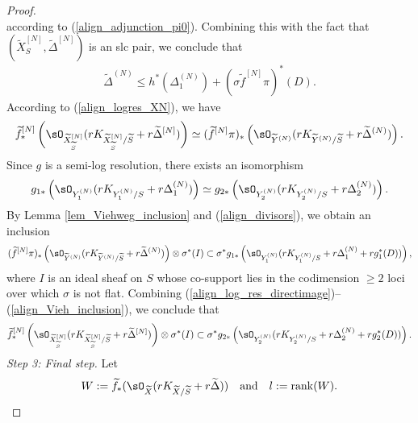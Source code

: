\documentclass[11pt,letterpaper]{amsart}
\numberwithin{equation}{section}
\begin{document}
\begin{proof}
$$		$$  
		according to (\ref{align_adjunction_pi0}). Combining this with the fact that $(\widetilde{X}^{[N]}_{S}, \widetilde{\Delta}^{[N]})$ is an slc pair, we conclude that  
		\begin{align}\label{align_divisors}
			\widetilde{\Delta}^{(N)} \leq h^{\ast}(\Delta_1^{(N)}) + (\sigma\widetilde{f}^{[N]} \pi)^{\ast}(D).
		\end{align}
		According to (\ref{align_logres_XN}), we have  
		\begin{align}\label{align_log_res_directimage}  
			\widetilde{f}^{[N]}_\ast\left(\sO_{\widetilde{X}^{[N]}_{\widetilde{S}}}(rK_{\widetilde{X}^{[N]}_{\widetilde{S}}/\widetilde{S}} + r\widetilde{\Delta}^{[N]})\right) \simeq (\widetilde{f}^{[N]} \pi)_\ast\left(\sO_{\widetilde{Y}^{(N)}}(rK_{\widetilde{Y}^{(N)}/\widetilde{S}} + r\widetilde{\Delta}^{(N)})\right).  
		\end{align}  		
		Since $g$ is a semi-log resolution, there exists an isomorphism  
		\begin{align*}  
			g_{1\ast}\left(\sO_{Y^{(N)}_1}(rK_{Y^{(N)}_1/S} + r\Delta^{(N)}_1)\right) \simeq g_{2\ast}\left(\sO_{Y^{(N)}_2}(rK_{Y^{(N)}_2/S} + r\Delta^{(N)}_2)\right).  
		\end{align*}  		
		By Lemma \ref{lem_Viehweg_inclusion} and (\ref{align_divisors}), we obtain an inclusion  
		\begin{align}\label{align_Vieh_inclusion}  
			(\widetilde{f}^{[N]} \pi)_\ast\left(\sO_{\widetilde{Y}^{(N)}}(rK_{\widetilde{Y}^{(N)}/\widetilde{S}} + r\widetilde{\Delta}^{(N)})\right) \otimes \sigma^\ast(I) \subset \sigma^\ast g_{1\ast}\left(\sO_{Y^{(N)}_1}(rK_{Y^{(N)}_1/S} + r\Delta^{(N)}_1 + rg_1^\ast(D))\right),  
		\end{align}  
		where $I$ is an ideal sheaf on $S$ whose co-support lies in the codimension $\geq 2$ loci over which $\sigma$ is not flat.  		
		Combining (\ref{align_log_res_directimage})--(\ref{align_Vieh_inclusion}), we conclude that  
		\begin{align}\label{align_finally}  
			\widetilde{f}^{[N]}_\ast\left(\sO_{\widetilde{X}^{[N]}_{\widetilde{S}}}(rK_{\widetilde{X}^{[N]}_{\widetilde{S}}/\widetilde{S}} + r\widetilde{\Delta}^{[N]})\right) \otimes \sigma^\ast(I) \subset \sigma^\ast g_{2\ast}\left(\sO_{Y^{(N)}_2}(rK_{Y^{(N)}_2/S} + r\Delta^{(N)}_2 + rg_2^\ast(D))\right).  
		\end{align}
		\emph{Step 3: Final step.} 
		Let
		$$W:=\widetilde{f}_\ast(\sO_{\widetilde{X}}(rK_{\widetilde{X}/\widetilde{S}}+r\widetilde{\Delta}))\quad\textrm{and}\quad l:={\rm rank}(W).$$

\end{proof}
\end{document}
